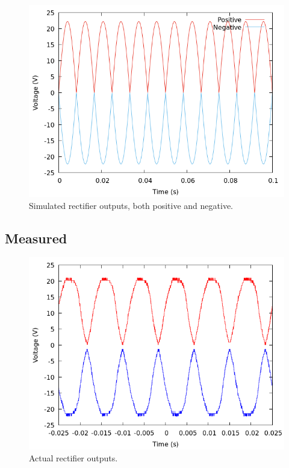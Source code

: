\documentclass[12pt]{article}
\newcommand{\graphwidth}{0.5\linewidth}
\begin{document}
\begin{appendix}
\begin{figure}[H]
    \centering
    \includegraphics[width=\graphwidth]{./res/image/sim-rectifier-unfiltered.png}
    \caption{Simulated rectifier outputs, both positive and negative.}
    \label{sim:rectifier_unfiltered}
\end{figure}

\subsection{Measured}

\begin{figure}[H]
    \centering
    \includegraphics[width=\graphwidth]{./res/image/rectifier-output.png}
    \caption{Actual rectifier outputs.}
    \label{fig:rectifier_unfiltered}
\end{figure}


\end{appendix}
\end{document}
